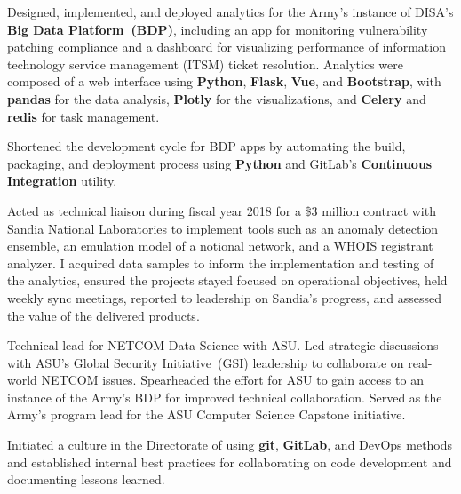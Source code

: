 


\begin{rExperience}

  \item Designed, implemented, and deployed analytics for the Army's instance of DISA's \textbf{Big Data
    Platform~(BDP)}, including an app for monitoring vulnerability patching compliance and a dashboard for visualizing
    performance of information technology service management (ITSM) ticket resolution. Analytics were composed of a web
    interface using \textbf{Python}, \textbf{Flask}, \textbf{Vue}, and \textbf{Bootstrap}, with \textbf{pandas} for the
    data analysis, \textbf{Plotly} for the visualizations, and \textbf{Celery} and \textbf{redis} for task management.

  \item Shortened the development cycle for BDP apps by automating the build, packaging, and deployment process using
    \textbf{Python} and GitLab's \textbf{Continuous Integration} utility.

  \item Acted as technical liaison during fiscal year 2018 for a \$3 million contract with Sandia National Laboratories
    to implement tools such as an anomaly detection ensemble, an emulation model of a notional network, and a WHOIS
    registrant analyzer. I acquired data samples to inform the implementation and testing of the analytics, ensured the
    projects stayed focused on operational objectives, held weekly sync meetings, reported to leadership on Sandia's
    progress, and assessed the value of the delivered products.

  \item Technical lead for NETCOM Data Science with ASU. Led strategic discussions with ASU's Global Security
    Initiative~(GSI) leadership to collaborate on real-world NETCOM issues. Spearheaded the effort for ASU to gain
    access to an instance of the Army's BDP for improved technical collaboration. Served as the Army's program lead for
    the ASU Computer Science Capstone initiative.

  \item Initiated a culture in the Directorate of using \textbf{git}, \textbf{GitLab}, and DevOps methods and
    established internal best practices for collaborating on code development and documenting lessons learned.

\end{rExperience}
